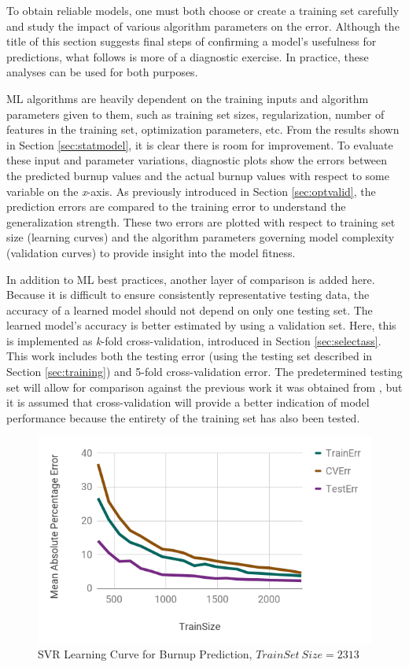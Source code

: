 To obtain reliable models, one must both choose or create a training set
carefully and study the impact of various algorithm parameters on the error.
Although the title of this section suggests final steps of confirming a model's
usefulness for predictions, what follows is more of a diagnostic exercise. 
In practice, these analyses can be used for both purposes.

\gls{ML} algorithms are heavily dependent on the training inputs and algorithm
parameters given to them, such as training set sizes, regularization, number of
features in the training set, optimization parameters, etc.  From the results
shown in Section \ref{sec:statmodel}, it is clear there is room for
improvement.  To evaluate these input and parameter variations, diagnostic
plots show the errors between the predicted burnup values and the actual burnup
values with respect to some variable on the \textit{x}-axis.  As previously
introduced in Section \ref{sec:optvalid}, the prediction errors are compared to
the training error to understand the generalization strength. These two errors
are plotted with respect to training set size (learning curves) and the
algorithm parameters governing model complexity (validation curves) to provide
insight into the model fitness. 

In addition to \gls{ML} best practices, another layer of comparison is
added here.  Because it is difficult to ensure consistently representative
testing data, the accuracy of a learned model should not depend on only one
testing set.  The learned model's accuracy is better estimated by using a
validation set. Here, this is implemented as \textit{k}-fold cross-validation,
introduced in Section \ref{sec:selectass}. This work includes both the testing
error (using the testing set described in Section \ref{sec:training}) and
5-fold cross-validation error. The predetermined testing set will allow for
comparison against the previous work it was obtained from
\cite{dayman_feasibility_2013}, but it is assumed that cross-validation will
provide a better indication of model performance because the entirety of the
training set has also been tested. 

\begin{figure}[!htb]
    \centering
    \includegraphics[width=\linewidth]{./chapters/demo_method/lc1.png}
    \caption{\acrshort{SVR} Learning Curve for Burnup Prediction, $TrainSet\ Size = 2313$}
    \label{fig:lc1}
\end{figure}

